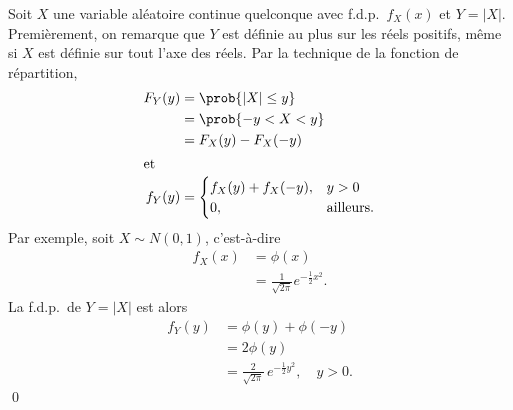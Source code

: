 \begin{exemple}
  \label{ex:transformations:val_abs}
  Soit $X$ une variable aléatoire continue quelconque avec f.d.p.\
  $f_X(x)$ et $Y = |X|$. Premièrement, on remarque que $Y$ est définie
  au plus sur les réels positifs, même si $X$ est définie sur tout
  l'axe des réels. Par la technique de la fonction de répartition,
  \begin{align*}
    F_Y(y)
    &= \prob{|X| \leq y} \\
    &= \prob{-y < X < y} \\
    &= F_X(y) - F_X(-y) \\
    \intertext{et}
    f_Y(y)
    &=
    \begin{cases}
      f_X(y) + f_X(-y), & y > 0 \\
      0, & \text{ailleurs}.
    \end{cases}
  \end{align*}
  Par exemple, soit $X \sim N(0, 1)$, c'est-à-dire
  \begin{align*}
    f_X(x)
    &= \phi(x) \\
    &= \frac{1}{\sqrt{2\pi}} e^{- \frac{1}{2} x^2}.
  \end{align*}
  La f.d.p.\ de $Y = |X|$ est alors
  \begin{align*}
    f_Y(y)
    &= \phi(y) + \phi(-y) \\
    &= 2 \phi(y) \\
    &= \frac{2}{\sqrt{2\pi}}\, e^{- \frac{1}{2} y^2}, \quad y > 0.
  \end{align*}
  \qed
\end{exemple}

